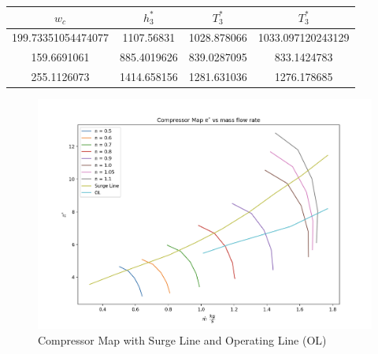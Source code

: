 \documentclass[titlepage]{article}
\begin{document}
\begin{enumerate}
\begin{center}
  \begin{tabular}{|c|c|c|c|}
    \hline
    $w_{c}$ & $h_{3}^{*}$ & $T_{3}^{*}$ & $T_{3}^{*}$ \\
    \hline
    199.73351054474077	& 1107.56831	& 1028.878066	& 1033.097120243129 \\
    \hline
    159.6691061	& 885.4019626 &	839.0287095 & 833.1424783 \\
    \hline
    255.1126073	& 1414.658156	& 1281.631036 & 1276.178685 \\
    \hline
  \end{tabular}
\end{center}



\end{enumerate}

\begin{figure}[h]
  \centering
  \includegraphics[width=\textwidth]{CompressorMap.png}
  \caption{Compressor Map with Surge Line and Operating Line (OL)}
  \label{fig:CompressorMap}
\end{figure}

\vspace{2cm}
\end{document}
